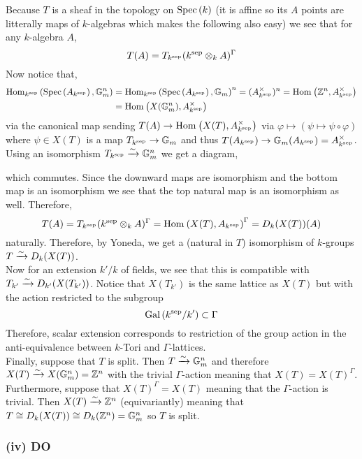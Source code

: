 \documentclass[12pt]{article}
\begin{document}
Because $T$ is a sheaf in the \etale topology on $\mathrm{Spec}\left( k \right)$ (it is affine so its $A$ points are litterally maps of $k$-algebras which makes the following also easy) we see that for any $k$-algebra $A$,
\[ T(A) = T_{k^{\mathrm{sep}}}(k^{\mathrm{sep}} \otimes_k A)^\Gamma \]
Now notice that,
\begin{align*}
\mathrm{Hom}_{k^{\mathrm{sep}}} \left( \mathrm{Spec}\left( A_{k^{\mathrm{sep}}} \right), \mathbb{G}_m^n \right) &= \mathrm{Hom}_{k^{\mathrm{sep}}} \left( \mathrm{Spec}\left( A_{k^{\mathrm{sep}}} \right), \mathbb{G}_m \right)^n = (A_{k^{\mathrm{sep}}}^\times)^n = \mathrm{Hom}_{} \left( \mathbb{Z}^n, A_{k^{\mathrm{sep}}}^\times \right) 
\\
& = \mathrm{Hom}_{} \left( X(\mathbb{G}_m^n), A_{k^{\mathrm{sep}}}^\times \right)
\end{align*}
via the canonical map sending $T(A) \to \mathrm{Hom}_{} \left( X(T), A^\times_{k^{\mathrm{sep}}} \right)$ via $\varphi \mapsto (\psi \mapsto \psi \circ \varphi)$ where $\psi \in X(T)$ is a map $T_{k^{\mathrm{sep}}} \to \mathbb{G}_m$ and thus $T(A_{k^{\mathrm{sep}}}) \to \mathbb{G}_m(A_{k^{\mathrm{sep}}}) = A_{k^{\mathrm{sep}}}^\times$. Using an isomorphism $T_{k^{\mathrm{sep}}} \xrightarrow{\sim} \mathbb{G}_m^n$ we get a diagram,
\begin{center}
\end{center}
which commutes. Since the downward maps are isomorphism and the bottom map is an isomorphism we see that the top natural map is an isomorphism as well. Therefore,
\[ T(A) = T_{k^{\mathrm{sep}}}(k^{\mathrm{sep}} \otimes_k A)^\Gamma = \mathrm{Hom}_{} \left( X(T), A_{k^{\mathrm{sep}}} \right)^\Gamma = D_k(X(T))(A) \]
naturally. Therefore, by Yoneda, we get a (natural in $T$) isomorphism of $k$-groups $T \xrightarrow{\sim} D_k(X(T))$.
\bigskip\\
Now for an extension $k'/k$ of fields, we see that this is compatible with $T_{k'} \xrightarrow{\sim} D_{k'}(X(T_{k'}))$. Notice that $X(T_{k'})$ is the same lattice as $X(T)$ but with the action restricted to the subgroup 
\[ \mathrm{Gal}\left( k^{\mathrm{sep}}/k' \right) \subset \Gamma \]
Therefore, scalar extension corresponds to restriction of the group action in the anti-equivalence between $k$-Tori and $\Gamma$-lattices.
\bigskip\\
Finally, suppose that $T$ is split. Then $T \xrightarrow{\sim} \mathbb{G}_m^n$ and therefore $X(T) \xrightarrow{\sim} X(\mathbb{G}_m^n) = \mathbb{Z}^n$ with the trivial $\Gamma$-action meaning that $X(T) = X(T)^\Gamma$. Furthermore, suppose that $X(T)^\Gamma = X(T)$ meaning that the $\Gamma$-action is trivial. Then $X(T) \xrightarrow{\sim} \mathbb{Z}^n$ (equivariantly) meaning that $T \cong D_k(X(T)) \cong D_k(\mathbb{Z}^n) = \mathbb{G}_m^n$ so $T$ is split.

\subsubsection{(iv) DO}
\end{document}
